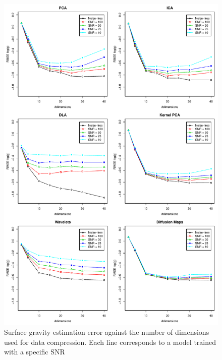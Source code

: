\documentclass[a4paper,fleqn,usenatbib]{mnras}
\begin{document}
{{{\begin{figure}
\centering\includegraphics[height=0.95\textheight]{flamesHR10_Logg_log_BestSVM_N-SNR-RMSE_test.pdf}
\caption{Surface gravity estimation error against the number of dimensions
  used for data compression. Each line corresponds to a model trained
  with a specific SNR}
\label{fig:methodsnrLogg}
\end{figure}

}}}
\end{document}
